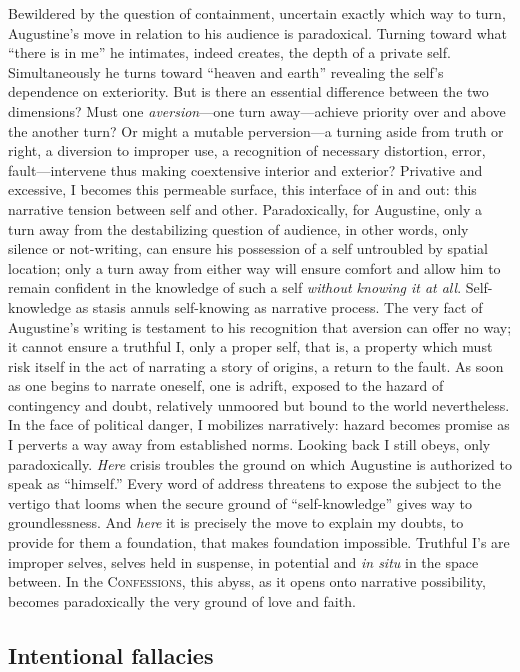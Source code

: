 \documentclass[
]{memoir}
\begin{document}
Bewildered by the question of containment, uncertain exactly which way
to turn, Augustine's move in relation to his audience is paradoxical.
Turning toward what ``there is in me'' he intimates, indeed creates, the
depth of a private self. Simultaneously he turns toward ``heaven and
earth'' revealing the self's dependence on exteriority. But is there an
essential difference between the two dimensions? Must one
\emph{aversion}---one turn away---achieve priority over and above the
another turn? Or might a mutable perversion---a turning aside from truth
or right, a diversion to improper use, a recognition of necessary
distortion, error, fault---intervene thus making coextensive interior
and exterior? Privative and excessive, I becomes this permeable surface,
this interface of in and out: this narrative tension between self and
other. Paradoxically, for Augustine, only a turn away from the
destabilizing question of audience, in other words, only silence or
not-writing, can ensure his possession of a self untroubled by spatial
location; only a turn away from either way will ensure comfort and allow
him to remain confident in the knowledge of such a self \emph{without
knowing it at all}. Self-knowledge as stasis annuls self-knowing as
narrative process. The very fact of Augustine's writing is testament to
his recognition that aversion can offer no way; it cannot ensure a
truthful I, only a proper self, that is, a property which must risk
itself in the act of narrating a story of origins, a return to the
fault. As soon as one begins to narrate oneself, one is adrift, exposed
to the hazard of contingency and doubt, relatively unmoored but bound to
the world nevertheless. In the face of political danger, I mobilizes
narratively: hazard becomes promise as I perverts a way away from
established norms. Looking back I still obeys, only paradoxically.
\emph{Here} crisis troubles the ground on which Augustine is authorized
to speak as ``himself.'' Every word of address threatens to expose the
subject to the vertigo that looms when the secure ground of
``self-knowledge'' gives way to groundlessness. And \emph{here} it is
precisely the move to explain my doubts, to provide for them a
foundation, that makes foundation impossible. Truthful I's are improper
selves, selves held in suspense, in potential and \emph{in situ} in the
space between. In the \textsc{Confessions}, this abyss, as it opens onto
narrative possibility, becomes paradoxically the very ground of love and
faith.

\hypertarget{intentional-fallacies}{%
\subsection*{Intentional fallacies}\label{intentional-fallacies}}
\end{document}
